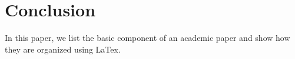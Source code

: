 \section{Conclusion}
\label{sec:conclusion}
In this paper, we list the basic component of an academic paper and show how they are organized using LaTex.